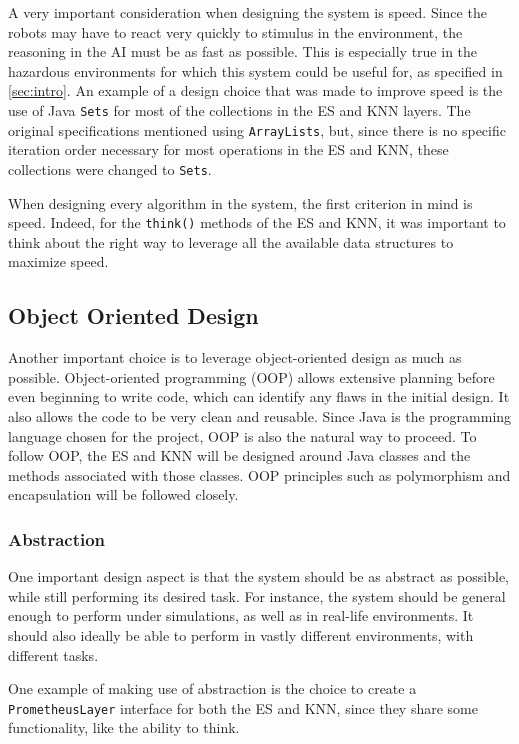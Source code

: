 \documentclass[titlepage,11pt]{article}
\newcommand{\code}[1]{\texttt{#1}}
\begin{document}
A very important consideration when designing the system is speed. Since the robots may have to react very quickly to stimulus in the environment, the reasoning in the AI must be as fast as possible. This is especially true in the hazardous environments for which this system could be useful for, as specified in \autoref{sec:intro}. An example of a design choice that was made to improve speed is the use of Java \code{Sets} for most of the collections in the ES and KNN layers. The original specifications mentioned using \code{ArrayLists}, but, since there is no specific iteration order necessary for most operations in the ES and KNN, these collections were changed to \code{Sets}.

When designing every algorithm in the system, the first criterion in mind is speed. Indeed, for the \code{think()} methods of the ES and KNN, it was important to think about the right way to leverage all the available data structures to maximize speed.

\subsection{Object Oriented Design}

Another important choice is to leverage object-oriented design as much as possible. Object-oriented programming (OOP) allows extensive planning before even beginning to write code, which can identify any flaws in the initial design. It also allows the code to be very clean and reusable. Since Java is the programming language chosen for the project, OOP is also the natural way to proceed. To follow OOP, the ES and KNN will be designed around Java classes and the methods associated with those classes. OOP principles such as polymorphism and encapsulation will be followed closely.

\subsubsection{Abstraction}

One important design aspect is that the system should be as abstract as possible, while still performing its desired task. For instance, the system should be general enough to perform under simulations, as well as in real-life environments. It should also ideally be able to perform in vastly different environments, with different tasks.

One example of making use of abstraction is the choice to create a \code{PrometheusLayer} interface for both the ES and KNN, since they share some functionality, like the ability to think.
\end{document}

